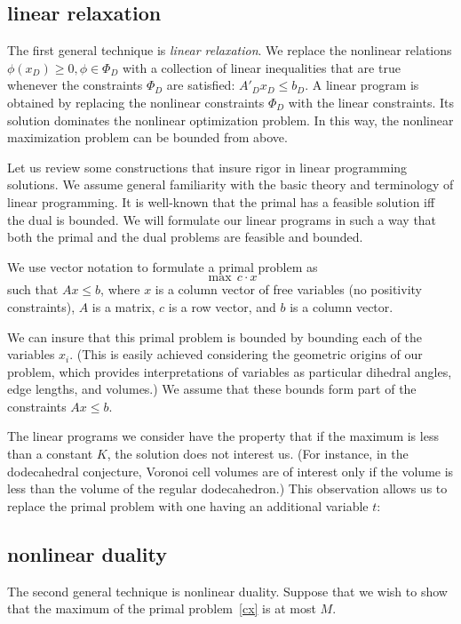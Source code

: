 \subsection{linear relaxation}
The first general technique is {\it linear relaxation}. We replace
the nonlinear relations $\phi(x_D)\ge0, \phi\in\Phi_D$ with a
collection of linear inequalities that are true whenever the
constraints $\Phi_D$ are satisfied: $A'_D x_D \le b_D$.  A linear
program is obtained by replacing the nonlinear constraints
$\Phi_D$ with the linear constraints. Its solution dominates the
nonlinear optimization problem.  In this way, the nonlinear
maximization problem can be bounded from above.

Let us review some constructions that insure rigor in linear
programming solutions. We assume general familiarity with the
basic theory and terminology of linear programming. It is
well-known that the primal has a feasible solution iff the dual is
bounded.  We will formulate our linear programs in such a way that
both the primal and the dual problems are feasible and bounded.

We use vector notation to formulate a primal problem as
    \begin{equation}
        \max\, c\cdot x
        \label{cx}
    \end{equation}
such that $A x \le b$, where $x$ is a column vector of free
variables (no positivity constraints), $A$ is a matrix, $c$ is a
row vector, and $b$ is a column vector.

We can insure that this primal problem is bounded by bounding each
of the variables $x_i$.  (This is easily achieved considering the
geometric origins of our problem, which provides interpretations
of variables as particular dihedral angles, edge lengths, and
volumes.) We assume that these bounds form part of the constraints
$A x\le b$.

The linear programs we consider have the property that if the
maximum is less than a constant $K$, the solution does not
interest us.  (For instance, in the dodecahedral conjecture,
Voronoi cell volumes are of interest only if the volume is less
than the volume of the regular dodecahedron.) This observation
allows us to replace the primal problem with one having an
additional variable $t$:


\subsection{nonlinear duality}
The second general technique is nonlinear duality.  Suppose that
we wish to show that the maximum of the primal problem~\ref{cx} is
at most $M$.

